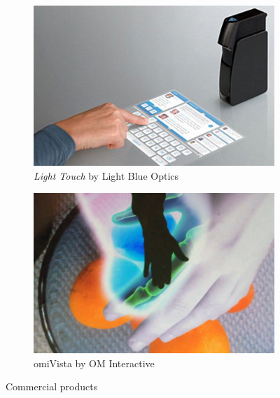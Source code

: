  \begin{figure}[htbp]
        \centering
        \begin{subfigure}[b]{0.48\textwidth}
                \includegraphics[width=\textwidth]{images/relatedwork/lbo.jpg}
                \caption{\emph{Light Touch} by Light Blue Optics\footnotemark}
                \label{img:lbo}
        \end{subfigure}
        \hfill
        \begin{subfigure}[b]{0.48\textwidth}      
                \includegraphics[width=\textwidth]{images/relatedwork/omi.jpg}
                \caption{omiVista by OM Interactive}
                \label{img:omi}
        \end{subfigure}
        \caption{Commercial products}\label{fig:animals}
\end{figure}

